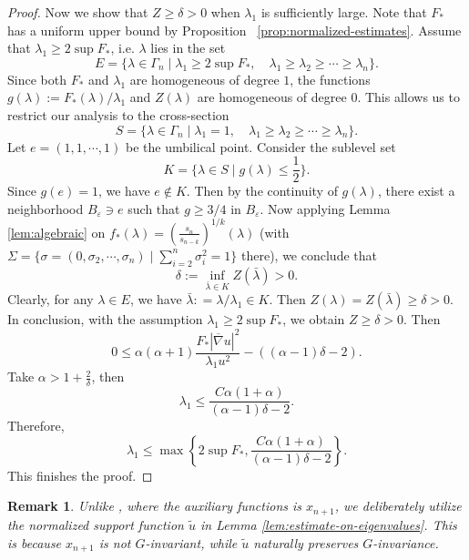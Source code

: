 \documentclass[10pt,a4paper]{amsart}
\newtheorem{remark}[theorem]{Remark}
\newcommand{\eps}{\ensuremath{\varepsilon}}
\newcommand{\bnabla}{\overline{\nabla}}
\numberwithin{equation}{section}
\begin{document}
\begin{proof}
    Now we show that \(Z \geq \delta >0\) when \(\lambda_1\) is sufficiently large. Note that \(F_*\) has a uniform upper bound by Proposition ~\ref{prop:normalized-estimates}. Assume that \(\lambda_1 \geq 2\sup F_*\), i.e. \(\lambda\) lies in the set
    \[ E = \{\lambda \in \Gamma_n \mid \lambda_1 \geq 2 \sup F_*, \quad\lambda_1\geq \lambda_2\geq \cdots \geq \lambda_n\}. \]
    Since both \(F_*\) and \(\lambda_1\) are homogeneous of degree \(1\), the functions \(g(\lambda) := F_*(\lambda)/\lambda_1\) and \(Z(\lambda)\) are homogeneous of degree \(0\). This allows us to restrict our analysis to the cross-section 
    \[ S = \{\lambda \in \Gamma_n \mid \lambda_1 = 1,\quad \lambda_1\geq \lambda_2\geq \cdots \geq \lambda_n\}.\] 
    Let \(e = (1,1,\cdots,1)\) be the umbilical point. Consider the sublevel set 
    \[ K = \{ \lambda \in S \mid g(\lambda) \leq \frac{1}{2} \}. \]
    Since \(g(e) = 1\), we have \(e\notin K\). Then by the continuity of \(g(\lambda)\), there exist a neighborhood \(B_{\eps}\ni e\) such that \(g\geq 3/4\) in \(B_{\eps}\). Now applying Lemma \ref{lem:algebraic} on \(f_*(\lambda) = \left(\frac{s_n}{s_{n-k}}\right)^{1/k}(\lambda)\) (with \(\Sigma = \{\sigma=(0,\sigma_2,\cdots,\sigma_n)\mid \sum_{i=2}^{n}\sigma_i^2 = 1\}\) there), we conclude that 
    \[ \delta := \inf_{\bar{\lambda} \in K} Z(\bar{\lambda}) > 0. \] 
    Clearly, for any \(\lambda\in E\), we have \(\bar{\lambda}: = \lambda / \lambda_1 \in K\). Then \(Z(\lambda) = Z(\bar{\lambda}) \geq \delta > 0\). 
    In conclusion, with the assumption \(\lambda_1 \geq 2\sup F_*\), we obtain \(Z\geq \delta > 0\). Then
    \[ 0 \leq \alpha(\alpha+1)\frac{F_*|\bnabla u|^2}{\lambda_1 u^2} - ((\alpha-1)\delta - 2). \]
    Take \(\alpha > 1 + \frac{2}{\delta}\), then 
    \[ \lambda_1 \leq \frac{C\alpha(1+\alpha)}{(\alpha-1)\delta - 2}. \]
    Therefore, 
    \[ \lambda_1 \leq \max \left\{ 2\sup F_*, \frac{C\alpha(1+\alpha)}{(\alpha-1)\delta - 2} \right\}. \]
    This finishes the proof.
\end{proof}

\begin{remark}
   Unlike \cite{WX20}, where the auxiliary functions is $x_{n+1}$, we deliberately utilize the normalized support function $\tilde{u}$ in Lemma \ref{lem:estimate-on-eigenvalues}. This is because $x_{n+1}$ is not $G$-invariant, while $\tilde{u}$ naturally preserves $G$-invariance. 
\end{remark}
\end{document}
